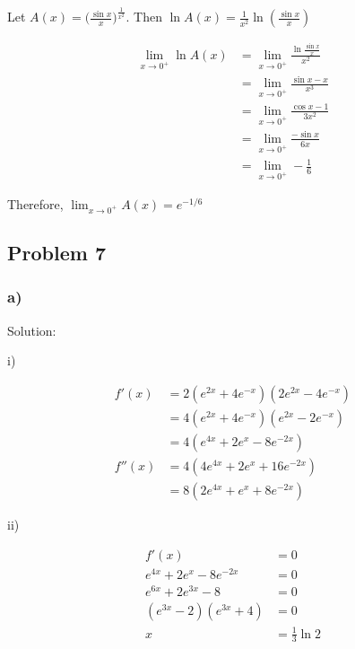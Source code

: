 \documentclass[letterpaper, 11pt]{article}
\newcommand{\1}{\mathds{1}}	%
\theoremstyle{definition}
\begin{document}
  Let $A(x) = \big( \frac{\sin x}{x}\big)^{\frac{1}{x ^{2}}}$. Then $\ln A(x)  = \frac{1}{x ^{2}}\ln(\frac{\sin x}{x})$

  \begin{align*}
    \lim_{x \to 0 ^{+}} \ln A(x) & = \lim_{x \to 0 ^{+}}  \frac{\ln \frac{\sin x}{x}}{x ^{2}} \\
                                 & = \lim_{x \to 0 ^{+}} \frac{\sin x - x}{x ^{3}}            \\
                                 & =\lim_{x \to 0 ^{+}}  \frac{\cos x - 1}{3 x ^{2}}          \\
                                 & = \lim_{x \to 0 ^{+}} \frac{-\sin x}{6x}                   \\
                                 & = \lim_{x \to 0 ^{+}} -\frac{1}{6}
  \end{align*}

  Therefore, $\lim_{x \to 0 ^{+}} A(x) = e ^{-1/6}$

  \subsection*{Problem 7}

  \subsubsection*{a)}

  Solution:

  i)

  \begin{align*}
    f'(x)  & = 2(e ^{2x} + 4e ^{-x})(2e ^{2x} -4e ^{-x}) \\
           & = 4(e ^{2x} + 4e ^{-x})(e ^{2x} - 2e ^{-x}) \\
           & = 4 (e ^{4x} + 2e ^{x} - 8e ^{-2x})         \\
    f''(x) & = 4(4e ^{4x} + 2e ^{x} + 16e ^{-2x})        \\
           & = 8(2e ^{4x} + e ^{x} + 8e ^{-2x})
  \end{align*}

  ii)

  \begin{align*}
    f'(x)                         & = 0               \\
    e ^{4x} + 2e ^{x} - 8e ^{-2x} & = 0               \\
    e ^{6x} + 2e ^{3x} - 8        & =0                \\
    (e ^{3x} - 2)(e ^{3x} + 4)    & = 0               \\
    x                             & = \frac{1}{3}\ln2
  \end{align*}
\end{document}
